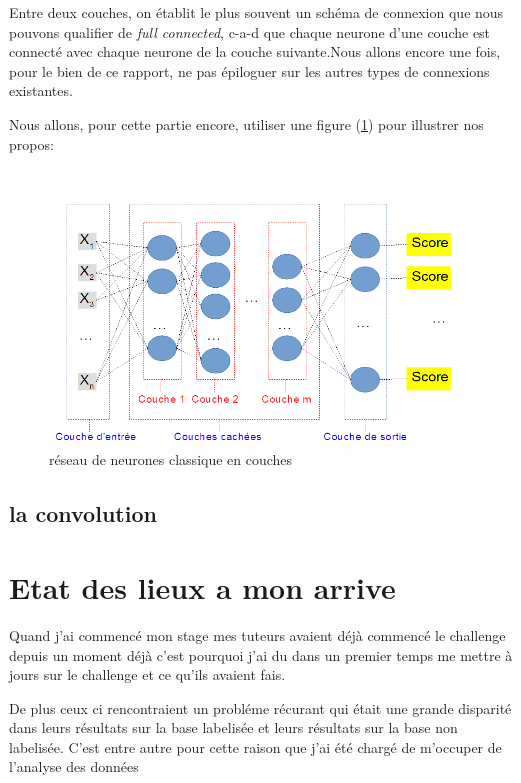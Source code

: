 Entre deux couches, on établit le plus souvent un schéma de connexion que nous pouvons qualifier de \textit{full connected}, c-a-d que chaque neurone d'une couche est connecté avec chaque neurone de la couche suivante.Nous allons encore une fois, pour le bien de ce rapport, ne pas épiloguer sur les autres types de connexions existantes.\newline

Nous allons, pour cette partie encore, utiliser une figure (\ref{reseauClassique}) pour illustrer nos propos:

\begin{figure}[h]
\includegraphics[width=16.5cm]{./images/multicouche.png}
\caption{réseau de neurones classique en couches}
\label{reseauClassique}
\end{figure}


\subsection{la convolution}
\label{la convolution}




\section{Etat des lieux a mon arrive}
\label{Etat des lieux à mon arrivé}

Quand j'ai commencé mon stage mes tuteurs avaient déjà commencé le challenge depuis un moment déjà c'est pourquoi j'ai du dans un premier temps me mettre à jours sur le challenge et ce qu'ils avaient fais.






De plus ceux ci rencontraient un probléme récurant qui était une grande disparité dans leurs résultats sur la base labelisée et leurs résultats sur la base non labelisée.
C'est entre autre pour cette raison que j'ai été chargé de m'occuper de l'analyse des données


